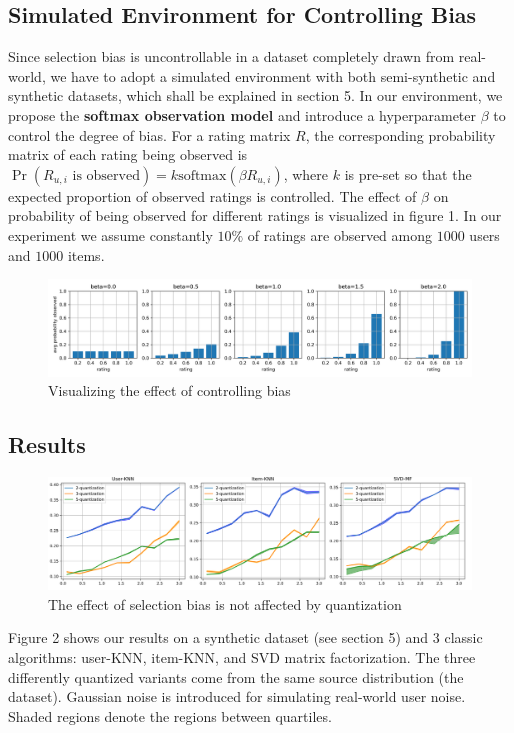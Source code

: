 \documentclass{article}
\begin{document}
\subsection{Simulated Environment for Controlling Bias}
Since selection bias is uncontrollable in a dataset completely drawn from real-world, we have to adopt a simulated environment \cite{krauth2020offline} with both semi-synthetic and synthetic datasets, which shall be explained in section 5. In our environment, we propose the \textbf{softmax observation model} and introduce a hyperparameter $\beta$ to control the degree of bias. For a rating matrix $R$, the corresponding probability matrix of each rating being observed is $\Pr(R_{u,i}\text{ is observed}) = k\text{softmax}(\beta R_{u,i})$, where $k$ is pre-set so that the expected proportion of observed ratings is controlled. The effect of $\beta$ on probability of being observed for different ratings is visualized in figure 1. In our experiment we assume constantly $10\%$ of ratings are observed among $1000$ users and $1000$ items.
\begin{figure}
  \centering
  \includegraphics[width=\textwidth]{visualize.png}
  \caption{Visualizing the effect of controlling bias}
\end{figure}

\subsection{Results}
\begin{figure}
  \centering
  \includegraphics[width=\textwidth]{1.png}
  \caption{The effect of selection bias is not affected by quantization}
\end{figure}
Figure 2 shows our results on a synthetic dataset (see section 5) and 3 classic algorithms: user-KNN, item-KNN, and SVD matrix factorization. The three differently quantized variants come from the same source distribution (the dataset). Gaussian noise is introduced for simulating real-world user noise. Shaded regions denote the regions between quartiles. 
\end{document}

